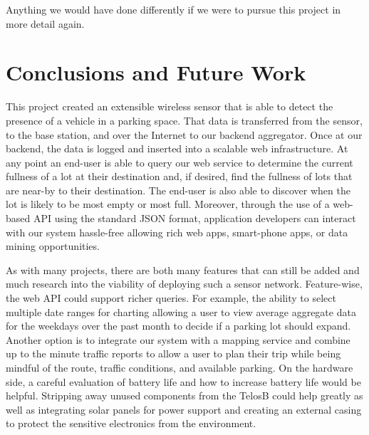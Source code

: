 \documentclass{acm_proc}
\begin{document}
Anything we would have done differently if we were to pursue this project
in more detail again.

\section{Conclusions and Future Work}\label{sec:conclusions}

This project created an extensible wireless sensor that is able to detect
the presence of a vehicle in a parking space.
That data is transferred from the sensor, to the base station, and over the
Internet to our backend aggregator.
Once at our backend, the data is logged and inserted into a scalable web
infrastructure.
At any point an end-user is able to query our web service to determine the
current fullness of a lot at their destination and, if desired, find the
fullness of lots that are near-by to their destination.
The end-user is also able to discover when the lot is likely to be most
empty or most full.
Moreover, through the use of a web-based API using the standard JSON
format, application developers can interact with our system hassle-free
allowing rich web apps, smart-phone apps, or data mining opportunities.

As with many projects, there are both many features that can still be added
and much research into the viability of deploying such a sensor network.
Feature-wise, the web API could support richer queries.
For example, the ability to select multiple date ranges for charting
allowing a user to view average aggregate data for the weekdays over the
past month to decide if a parking lot should expand.
Another option is to integrate our system with a mapping service and
combine up to the minute traffic reports to allow a user to plan their trip
while being mindful of the route, traffic conditions, and available
parking.
On the hardware side, a careful evaluation of battery life and how to
increase battery life would be helpful.
Stripping away unused components from the TelosB could help greatly as well
as integrating solar panels for power support and creating an external
casing to protect the sensitive electronics from the environment.



\end{document}
